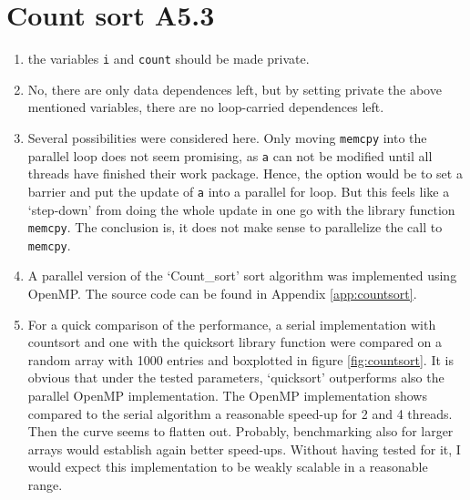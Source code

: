 \documentclass[a4paper,11pt,twoside]{article}
\begin{document}
\section{Count sort A5.3}
\begin{enumerate}[label={\alph*)}]
\item the variables \verb+i+ and \verb+count+ should be made private.
\item No, there are only data dependences left, but by setting private the above mentioned variables, there are no loop-carried dependences left. 
\item Several possibilities were considered here. Only moving \verb+memcpy+ into the parallel loop does not seem promising, as \verb+a+ can not be modified until all threads have finished their work package. Hence, the option would be to set a barrier and put the update of \verb+a+ into a parallel for loop. But this feels like a `step-down' from doing the whole update in one go with the library function \verb+memcpy+. The conclusion is, it does not make sense to parallelize the call to \verb+memcpy+.
\item A parallel version of the `Count\_sort' sort algorithm was implemented using OpenMP. The source code can be found in Appendix \ref{app:countsort}.
\item For a quick comparison of the performance, a serial implementation with countsort and one with the quicksort library function were compared on a random array with 1000 entries and boxplotted in figure \ref{fig:countsort}. It is obvious that under the tested parameters, `quicksort' outperforms also the parallel OpenMP implementation. The OpenMP implementation shows compared to the serial algorithm a reasonable speed-up for 2 and 4 threads. Then the curve seems to flatten out. Probably, benchmarking also for larger arrays would establish again better speed-ups. Without having tested for it, I would expect this implementation to be weakly scalable in a reasonable range.  
\end{enumerate}
\end{document}
